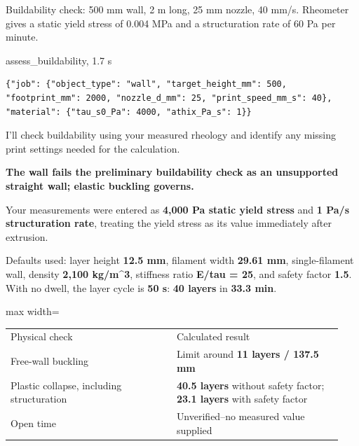 \begin{userbox}
Buildability check: 500 mm wall, 2 m long, 25 mm nozzle, 40 mm/s. Rheometer gives a static yield stress of 0.004 MPa and a structuration rate of 60 Pa per minute.
\end{userbox}
\begin{toolbox}{assess\_buildability, 1.7 s}
\begin{lstlisting}[style=argstyle]
{"job": {"object_type": "wall", "target_height_mm": 500, "footprint_mm": 2000, "nozzle_d_mm": 25, "print_speed_mm_s": 40}, "material": {"tau_s0_Pa": 4000, "athix_Pa_s": 1}}
\end{lstlisting}
\end{toolbox}
\begin{agentbox}
I'll check buildability using your measured rheology and identify any missing print settings needed for the calculation.\par
\textbf{The wall fails the preliminary buildability check as an unsupported straight wall; elastic buckling governs.}\par
\par
Your measurements were entered as \textbf{4,000 Pa static yield stress} and \textbf{1 Pa/s structuration rate}, treating the yield stress as its value immediately after extrusion.\par
\par
Defaults used: layer height \textbf{12.5 mm}, filament width \textbf{29.61 mm}, single-filament wall, density \textbf{2,100 kg/m\textasciicircum{}3}, stiffness ratio \textbf{E/tau = 25}, and safety factor \textbf{1.5}. With no dwell, the layer cycle is \textbf{50 s}: \textbf{40 layers} in \textbf{33.3 min}.\par
\par
\par\smallskip\begin{adjustbox}{max width=\linewidth}\begin{tabular}{p{0.47\linewidth}p{0.47\linewidth}}
Physical check & Calculated result \\
Free-wall buckling & Limit around \textbf{11 layers / 137.5 mm} \\
Plastic collapse, including structuration & \textbf{40.5 layers} without safety factor; \textbf{23.1 layers} with safety factor \\
Open time & Unverified--no measured value supplied \\
\end{tabular}\end{adjustbox}\par\smallskip

\end{agentbox}

